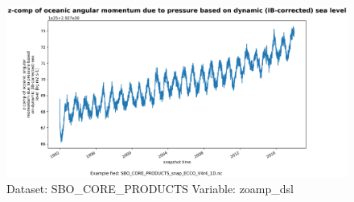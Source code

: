 \begin{figure}[H]
\centering
\includegraphics[width=\textwidth]{../images/plots/oneD_plots/SBO_Core_Products/zoamp_dsl.png}
\caption{Dataset: SBO\_CORE\_PRODUCTS Variable: zoamp\_dsl}
\label{tab:table-SBO_CORE_PRODUCTS_zoamp_dsl-Plot}
\end{figure}
\pagebreak
